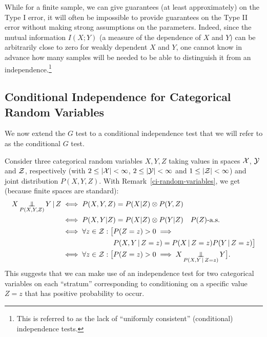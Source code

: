While for a finite sample, we can give guarantees (at least approximately) on the Type I error, it will often be
impossible to provide guarantees on the Type II error without making strong
assumptions on the parameters. Indeed, since the mutual information $I(X;Y)$ (a measure of
the dependence of $X$ and $Y$) can be arbitrarily close to zero for weakly dependent $X$ 
and $Y$, one cannot know in advance how many samples will be needed to be able to distinguish
it from an independence.\footnote{This is referred to as the lack of ``uniformly consistent''
(conditional) independence tests.}

\subsection{Conditional Independence for Categorical Random Variables}

We now extend the $G$ test to a conditional independence test that we will refer to as the conditional $G$ test.

Consider three categorical random variables $X,Y,Z$ taking values in spaces $\mathcal{X}$, $\mathcal{Y}$
and $\mathcal{Z}$, respectively (with $2 \le |\mathcal{X}| < \infty$, $2 \le |\mathcal{Y}| < \infty$ and $1 \le |\mathcal{Z}| < \infty$) and joint distribution $P(X,Y,Z)$.
With Remark~\ref{ci-random-variables}, we get (because finite spaces are standard):
\begin{equation*}\begin{split}
  X \operatorname*{\perp\mkern-11mu\perp}_{P(X,Y,Z)} Y \operatorname*{|} Z 
  & \iff P(X,Y,Z) = P(X | Z) \otimes P(Y,Z) \\
  & \iff P(X,Y | Z) = P(X | Z) \otimes P(Y | Z) \quad \text{$P(Z)$-a.s.} \\
  & \begin{split}
    {} \iff \forall z \in \mathcal{Z}: \big[ & P(Z=z) > 0 \implies \\
    & P(X,Y \operatorname*{|} Z=z) = P(X \operatorname*{|} Z=z) P(Y \operatorname*{|} Z=z) \big]
  \end{split} \\
  & \iff \forall z \in \mathcal{Z}: \big[P(Z=z) > 0 \implies X \operatorname*{\perp\mkern-11mu\perp}_{P(X,Y \operatorname*{|} Z=z)} Y \big].
\end{split}\end{equation*}
This suggests that we can make use of an independence test for two categorical variables
on each  ``stratum'' corresponding to conditioning on a specific value $Z=z$ that has
positive probability to occur.

